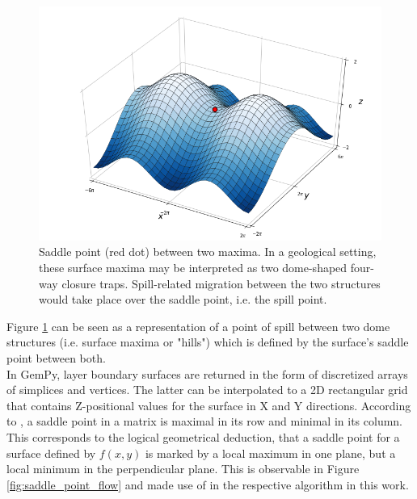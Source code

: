 			\begin{figure}[h]
				\centering
				\includegraphics[width=1\textwidth]{Figures/Saddle_Point_between_maxima.png}
				\caption{Saddle point (red dot) between two maxima. In a geological setting, these surface maxima may be interpreted as two dome-shaped four-way closure traps. Spill-related migration between the two structures would take place over the saddle point, i.e. the spill point.}\label{fig:saddle_point_maxima}
			\end{figure}
			Figure \ref{fig:saddle_point_maxima} can be seen as a representation of a point of spill between two dome structures (i.e. surface maxima or "hills") which is defined by the surface's saddle point between both.\\			
			In GemPy, layer boundary surfaces are returned in the form of discretized arrays of simplices and vertices. The latter can be interpolated to a 2D rectangular grid that contains Z-positional values for the surface in X and Y directions. According to \citet{verschelde2017programmingtools}, a saddle point in a matrix is maximal in its row and minimal in its column. This corresponds to the logical geometrical deduction, that a saddle point for a surface defined by $f(x,y)$ is marked by a local maximum in one plane, but a local minimum in the perpendicular plane. This is observable in Figure \ref{fig:saddle_point_flow} and made use of in the respective algorithm in this work.
